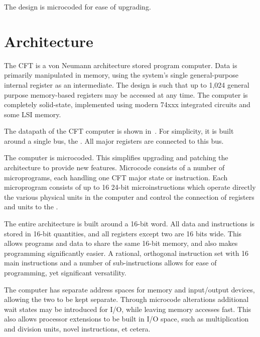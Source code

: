   The design is microcoded for ease of upgrading.

\section{Architecture}

The CFT is a \gls{von Neumann architecture} \gls{stored program computer}. Data
is primarily manipulated in memory, using the system's single general-purpose
internal \gls{register} as an intermediate. The design is such that up to 1,024
general purpose memory-based registers may be accessed at any time. The
computer is completely solid-state, implemented using modern 74xxx integrated
circuits and some LSI memory.

The datapath of the CFT computer is shown in~. For
simplicity, it is built around a single bus, the \IBUS. All major
registers are connected to this bus.

The computer is microcoded. This simplifies upgrading and patching the
architecture to provide new features. Microcode consists of a number
of microprograms, each handling one CFT major state or
instruction. Each microprogram consists of up to 16 24-bit
microinstructions which operate directly the various physical units in
the computer and control the connection of registers and units to the
\IBUS.

The entire architecture is built around a 16-bit word. All data and
instructions is stored in 16-bit quantities, and all registers except
two are 16 bits wide. This allows programs and data to share the same
16-bit memory, and also makes programming significantly easier. A
rational, orthogonal instruction set with 16 main instructions and a
number of sub-instructions allows for ease of programming, yet
significant versatility.

The computer has separate address spaces for memory and input/output
devices, allowing the two to be kept separate. Through microcode
alterations additional wait states may be introduced for I/O, while
leaving memory accesses fast. This also allows processor extensions to
be built in I/O space, such as multiplication and division units,
novel instructions, et cetera.

